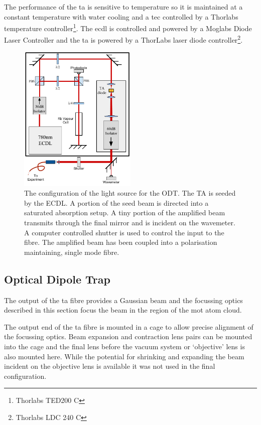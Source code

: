 The performance of the \gls{ta} is sensitive to temperature so it is maintained at a constant temperature with water cooling and a \gls{tec} controlled by a Thorlabs temperature controller\footnote{Thorlabs TED200 C}. The \gls{ecdl} is controlled and powered by a Moglabs Diode Laser Controller and the \gls{ta} is powered by a ThorLabs laser diode controller\footnote{Thorlabs LDC 240 C}.

\begin{figure}[h]
\centering
\includegraphics[width=0.5\textwidth]{figs/TAsetup.pdf}
\caption{The configuration of the light source for the ODT. The TA is seeded by the ECDL. A portion of the seed beam is directed into a saturated absorption setup. A tiny portion of the amplified beam transmits through the final mirror and is incident on the wavemeter. A computer controlled shutter is used to control the input to the fibre. The amplified beam has been coupled into a polarisation maintaining, single mode fibre.}
\end{figure}

\subsection{Optical Dipole Trap}

The output of the \gls{ta} fibre provides a Gaussian beam and the focussing optics described in this section focus the beam in the region of the \gls{mot} atom cloud.

The output end of the \gls{ta} fibre is mounted in a cage to allow precise alignment of the focussing optics. Beam expansion and contraction lens pairs can be mounted into the cage and the final lens before the vacuum system or `objective' lens is also mounted here. While the potential for shrinking and expanding the beam incident on the objective lens is available it was not used in the final configuration.

